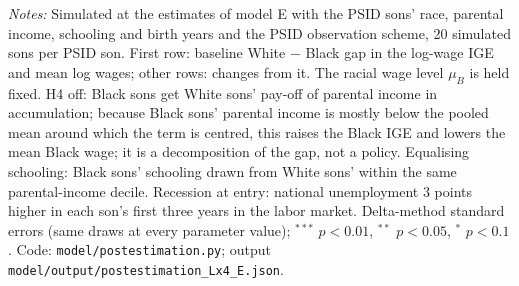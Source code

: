 \begin{table}[!htbp]
\centering
\caption{Counterfactuals in the selected model (E)}
\label{tab:modelcf}
\par\smallskip
\begin{minipage}{\textwidth}\footnotesize \textit{Notes:} Simulated at the estimates of model E with the PSID sons' race, parental income, schooling and birth years and the PSID observation scheme, 20 simulated sons per PSID son. First row: baseline White $-$ Black gap in the log-wage IGE and mean log wages; other rows: changes from it. The racial wage level $\mu_B$ is held fixed. H4 off: Black sons get White sons' pay-off of parental income in accumulation; because Black sons' parental income is mostly below the pooled mean around which the term is centred, this raises the Black IGE and lowers the mean Black wage; it is a decomposition of the gap, not a policy. Equalising schooling: Black sons' schooling drawn from White sons' within the same parental-income decile. Recession at entry: national unemployment 3 points higher in each son's first three years in the labor market. Delta-method standard errors (same draws at every parameter value); $^{***}$ $p<0.01$, $^{**}$ $p<0.05$, $^{*}$ $p<0.1$. Code: \texttt{model/postestimation.py}; output \texttt{model/output/postestimation\_Lx4\_E.json}.\end{minipage}
\end{table}
